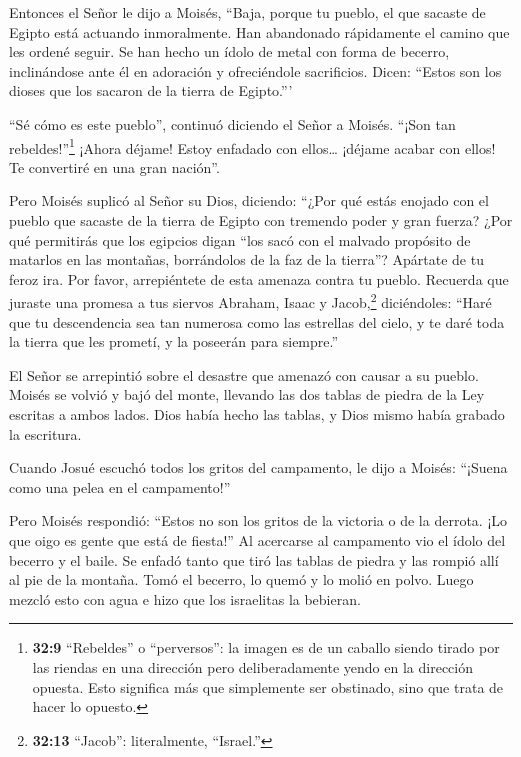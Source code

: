  Entonces el Señor le dijo a Moisés, ``Baja, porque tu
pueblo, el que sacaste de Egipto está actuando inmoralmente.
 Han abandonado rápidamente el camino que les ordené seguir.
Se han hecho un ídolo de metal con forma de becerro, inclinándose ante
él en adoración y ofreciéndole sacrificios. Dicen: ``Estos son los
dioses que los sacaron de la tierra de Egipto.'''

 ``Sé cómo es este pueblo'', continuó diciendo el Señor a
Moisés. ``¡Son tan rebeldes!''\footnote{\textbf{32:9} ``Rebeldes'' o
  ``perversos'': la imagen es de un caballo siendo tirado por las
  riendas en una dirección pero deliberadamente yendo en la dirección
  opuesta. Esto significa más que simplemente ser obstinado, sino que
  trata de hacer lo opuesto.}  ¡Ahora déjame! Estoy
enfadado con ellos\ldots{} ¡déjame acabar con ellos! Te convertiré en
una gran nación''.

 Pero Moisés suplicó al Señor su Dios, diciendo: ``¿Por qué
estás enojado con el pueblo que sacaste de la tierra de Egipto con
tremendo poder y gran fuerza?  ¿Por qué permitirás que los
egipcios digan ``los sacó con el malvado propósito de matarlos en las
montañas, borrándolos de la faz de la tierra''? Apártate de tu feroz
ira. Por favor, arrepiéntete de esta amenaza contra tu pueblo.
 Recuerda que juraste una promesa a tus siervos Abraham,
Isaac y Jacob,\footnote{\textbf{32:13} ``Jacob'': literalmente,
  ``Israel.''} diciéndoles: ``Haré que tu descendencia sea tan numerosa
como las estrellas del cielo, y te daré toda la tierra que les prometí,
y la poseerán para siempre.''

 El Señor se arrepintió sobre el desastre que amenazó con
causar a su pueblo.  Moisés se volvió y bajó del monte,
llevando las dos tablas de piedra de la Ley escritas a ambos lados.
 Dios había hecho las tablas, y Dios mismo había grabado la
escritura.

 Cuando Josué escuchó todos los gritos del campamento, le
dijo a Moisés: ``¡Suena como una pelea en el campamento!''

 Pero Moisés respondió: ``Estos no son los gritos de la
victoria o de la derrota. ¡Lo que oigo es gente que está de fiesta!''
 Al acercarse al campamento vio el ídolo del becerro y el
baile. Se enfadó tanto que tiró las tablas de piedra y las rompió allí
al pie de la montaña.  Tomó el becerro, lo quemó y lo molió
en polvo. Luego mezcló esto con agua e hizo que los israelitas la
bebieran.

